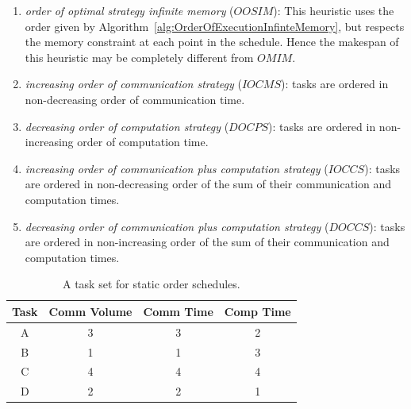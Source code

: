 \documentclass[sigconf]{acmart}
\begin{document}
	\begin{enumerate}[label=\roman*)]
		\item \textit{order  of  optimal strategy infinite memory} ($OOSIM$): This heuristic uses the order given by Algorithm~\ref{alg:OrderOfExecutionInfinteMemory}, but respects the memory constraint at each point in the schedule. Hence the makespan of this heuristic may be completely different from $OMIM$.
		
		\item \textit{increasing order of communication strategy} ($IOCMS$): tasks are ordered  in non-decreasing order of communication time. 
		
		\item \textit{decreasing order of computation strategy} ($DOCPS$): tasks are ordered in non-increasing order of computation time. 
		\item \textit{increasing order of communication plus computation strategy} ($IOCCS$): tasks are ordered in non-decreasing order of the sum of their communication and computation times.
		\item \textit{decreasing order of communication plus computation strategy} ($DOCCS$): tasks are ordered in non-increasing order of the sum of their communication and computation times.
		
	\end{enumerate}
	\begin{table}[htb]
		\begin{center}
			
			\begin{tabular}{|c|c|c|c|}
				\hline
				Task & Comm Volume & Comm Time & Comp Time\\ \hline 
				A & 3 & 3 &  2\\ \hline
				B & 1 & 1 & 3\\ \hline
				C & 4 & 4 & 4\\ \hline
				D & 2 & 2 & 1\\ \hline
			\end{tabular}
			\caption{\label{tab:staticOrderExample} A task set for static order schedules.}
		\end{center}
	\end{table}
	
\end{document}
